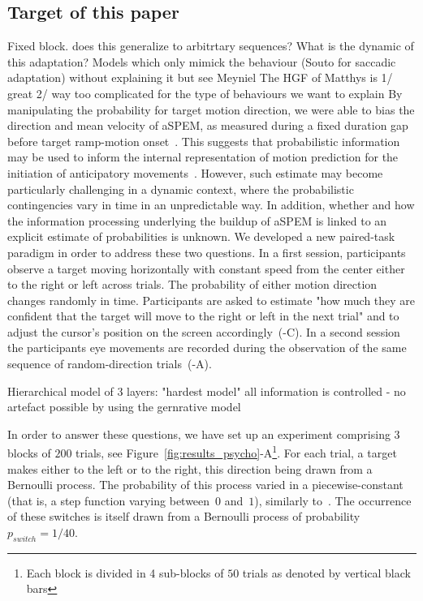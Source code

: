 \documentclass[profile,final,english, draft]{article}%
\begin{document}
\subsection{Target of this paper}
Fixed block. does this generalize to arbitrtary sequences? What is the dynamic of this adaptation?
Models which only mimick the behaviour (Souto for saccadic adaptation) without explaining it but see Meyniel
The HGF of Matthys is 1/ great 2/ way too complicated for the type of behaviours we want to explain
By manipulating the probability for target motion direction,
we were able to bias the direction and mean velocity of aSPEM,
as measured during a fixed duration gap
before target ramp-motion onset~.
This suggests that probabilistic information may be used
to inform the internal representation of motion prediction
for the initiation of anticipatory movements~\parencite{Montagnini2010}.
However, such estimate may become particularly
challenging in a dynamic context,
where the probabilistic contingencies vary in time in an unpredictable way.
In addition, whether and how the information processing underlying
the buildup of aSPEM is linked to
an explicit estimate of probabilities is unknown.
We developed a new paired-task paradigm in order to address these two questions.
In a first session, participants observe a target moving horizontally with constant speed from the center either to the right or left across trials. The probability of either motion direction changes randomly in time. Participants are asked to estimate "how much they are confident that the target will move to the right or left in the next trial" and to adjust the cursor's position on the screen accordingly~(-C). In a second session the participants eye movements are recorded during the observation of the same sequence of random-direction trials~(-A). %


Hierarchical model of 3 layers: "hardest model" all information is controlled - no artefact possible by using the gernrative model

In order to answer these questions, we have set up an experiment comprising $3$ blocks of $200$ trials, see Figure~\ref{fig:results_psycho}-A\footnote{Each block is divided in 4 sub-blocks of $50$ trials as denoted by vertical black bars}. For each trial, a target makes either to the left or to the right, this direction being drawn from a Bernoulli process. The probability of this process varied in a piecewise-constant (that is, a step function varying between~$0$ and~$1$), similarly to~\textcite{Meyniel13}. The occurrence of these switches is itself drawn from a Bernoulli process of probability $p_{switch}=1/40$.
\end{document}

